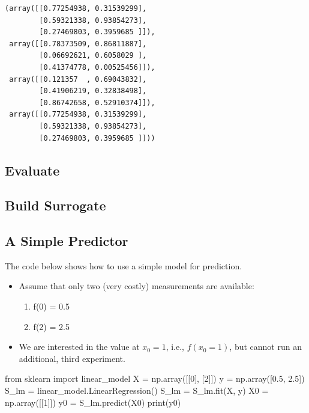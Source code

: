 \documentclass[
  letterpaper,
  DIV=11,
  numbers=noendperiod]{scrreprt}
\newenvironment{Shaded}{\begin{snugshade}}{\end{snugshade}}
\newcommand{\BuiltInTok}[1]{\textcolor[rgb]{0.00,0.23,0.31}{#1}}
\newcommand{\DecValTok}[1]{\textcolor[rgb]{0.68,0.00,0.00}{#1}}
\newcommand{\FloatTok}[1]{\textcolor[rgb]{0.68,0.00,0.00}{#1}}
\newcommand{\ImportTok}[1]{\textcolor[rgb]{0.00,0.46,0.62}{#1}}
\newcommand{\NormalTok}[1]{\textcolor[rgb]{0.00,0.23,0.31}{#1}}
\newcommand{\OperatorTok}[1]{\textcolor[rgb]{0.37,0.37,0.37}{#1}}
\providecommand{\tightlist}{%
  \setlength{\itemsep}{0pt}\setlength{\parskip}{0pt}}\usepackage{longtable,booktabs,array}
\begin{document}
\begin{verbatim}
(array([[0.77254938, 0.31539299],
        [0.59321338, 0.93854273],
        [0.27469803, 0.3959685 ]]),
 array([[0.78373509, 0.86811887],
        [0.06692621, 0.6058029 ],
        [0.41374778, 0.00525456]]),
 array([[0.121357  , 0.69043832],
        [0.41906219, 0.32838498],
        [0.86742658, 0.52910374]]),
 array([[0.77254938, 0.31539299],
        [0.59321338, 0.93854273],
        [0.27469803, 0.3959685 ]]))
\end{verbatim}

\subsection{Evaluate}\label{evaluate}

\subsection{Build Surrogate}\label{build-surrogate}

\subsection{A Simple Predictor}\label{a-simple-predictor}

The code below shows how to use a simple model for prediction.

\begin{itemize}
\item
  Assume that only two (very costly) measurements are available:

  \begin{enumerate}
  \def\labelenumi{\arabic{enumi}.}
  \tightlist
  \item
    f(0) = 0.5
  \item
    f(2) = 2.5
  \end{enumerate}
\item
  We are interested in the value at \(x_0 = 1\), i.e., \(f(x_0 = 1)\),
  but cannot run an additional, third experiment.
\end{itemize}

\begin{Shaded}
\begin{Highlighting}[]
\ImportTok{from}\NormalTok{ sklearn }\ImportTok{import}\NormalTok{ linear\_model}
\NormalTok{X }\OperatorTok{=}\NormalTok{ np.array([[}\DecValTok{0}\NormalTok{], [}\DecValTok{2}\NormalTok{]])}
\NormalTok{y }\OperatorTok{=}\NormalTok{ np.array([}\FloatTok{0.5}\NormalTok{, }\FloatTok{2.5}\NormalTok{])}
\NormalTok{S\_lm }\OperatorTok{=}\NormalTok{ linear\_model.LinearRegression()}
\NormalTok{S\_lm }\OperatorTok{=}\NormalTok{ S\_lm.fit(X, y)}
\NormalTok{X0 }\OperatorTok{=}\NormalTok{ np.array([[}\DecValTok{1}\NormalTok{]])}
\NormalTok{y0 }\OperatorTok{=}\NormalTok{ S\_lm.predict(X0)}
\BuiltInTok{print}\NormalTok{(y0)}
\end{Highlighting}
\end{Shaded}
\end{document}
